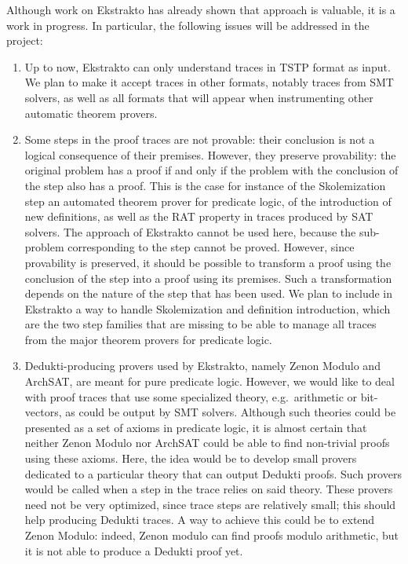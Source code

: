 Although work on Ekstrakto has already shown that approach is valuable,
it is a work in progress. In particular, the following issues will be
addressed in the project:

\begin{enumerate}
\item Up to now, Ekstrakto can only understand traces in TSTP format as
  input. We plan to make it accept traces in other formats, notably traces
  from SMT solvers, as well as all formats that will appear when instrumenting
  other automatic theorem provers.

\item Some steps in the proof traces are not provable: their
  conclusion is not a logical consequence of their premises. However,
  they preserve provability: the original problem has a proof if and
  only if the problem with the conclusion of the step also has a
  proof. This is the case for instance of the Skolemization step an
  automated theorem prover for predicate logic, of the introduction of
  new definitions, as well as the RAT property in traces produced by
  SAT solvers. The approach of Ekstrakto cannot be used here, because
  the sub-problem corresponding to the step cannot be proved. However,
  since provability is preserved, it should be possible to transform a
  proof using the conclusion of the step into a proof using its
  premises. Such a transformation depends on the nature of the step
  that has been used. We plan to include in Ekstrakto a way to handle
  Skolemization and definition introduction, which are the two step
  families that are missing to be able to manage all traces from the
  major theorem provers for predicate logic.


\item Dedukti-producing provers used by Ekstrakto, namely Zenon Modulo
  and ArchSAT, are meant for pure predicate logic. However, we would
  like to deal with proof traces that use some specialized theory,
  e.g.\ arithmetic or bit-vectors, as could be output by SMT
  solvers. Although such theories could be presented as a set of
  axioms in predicate logic, it is almost certain that neither Zenon
  Modulo nor ArchSAT could be able to find non-trivial proofs using
  these axioms. Here, the idea would be to develop small provers
  dedicated to a particular theory that can output Dedukti
  proofs. Such provers would be called when a step in the trace relies
  on said theory. These provers need not be very optimized, since
  trace steps are relatively small; this should help producing Dedukti
  traces. A way to achieve this could be to extend Zenon Modulo:
  indeed, Zenon modulo can find proofs modulo arithmetic, but it is
  not able to produce a Dedukti proof yet.
\end{enumerate}

